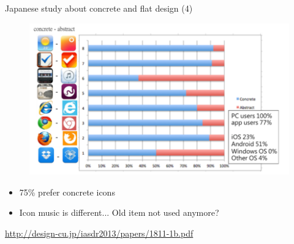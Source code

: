 \documentclass{beamer}
\begin{document}
\begin{frame}{Japanese study about concrete and flat design (4)}
	\begin{figure}
    	\centering
        \includegraphics[scale=0.6]{finalStat.png}
    \end{figure}
    \begin{itemize}
        \item 75\% prefer concrete icons
		\item Icon music is different... Old item not used anymore?
    \end{itemize}
	\begin{flushright}\tiny\url{http://design-cu.jp/iasdr2013/papers/1811-1b.pdf}\normalsize\end{flushright}
\end{frame}

%
%
\end{document}
